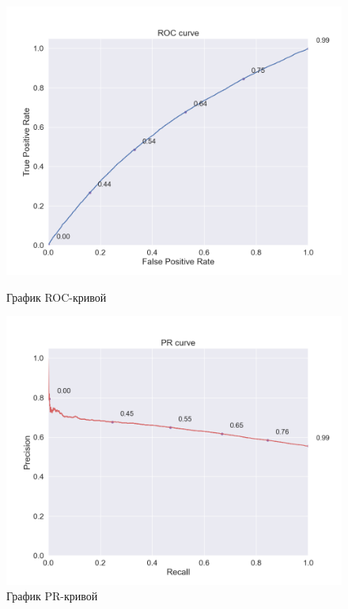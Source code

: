 \begin{figure}[h!]
\centering
\begin{minipage}{.5\textwidth}
\centering
\includegraphics[width=1.0\linewidth]{images/content/roc_curve}
\caption{График ROC-кривой}
\label{fig:content_roc}
\end{minipage}%
\begin{minipage}{.5\textwidth}
\centering
\includegraphics[width=1.0\linewidth]{images/content/pr_curve}
\caption{График PR-кривой}
\label{fig:content_pr}
\end{minipage}
\end{figure}

